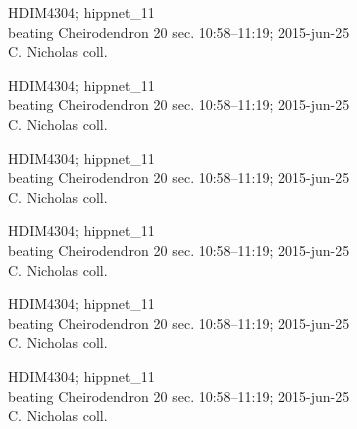 \documentclass[2pt]{extarticle}
\begin{document}
\noindent
\parbox{0.16\textwidth}{\tiny \raggedright \rule[-0.3\baselineskip]{0pt}{10pt}HDIM4304; hippnet\_11\\ beating Cheirodendron 20 sec. 10:58--11:19; 2015-jun-25\\ C. Nicholas coll.}
\parbox{0.16\textwidth}{\tiny \raggedright \rule[-0.3\baselineskip]{0pt}{10pt}HDIM4304; hippnet\_11\\ beating Cheirodendron 20 sec. 10:58--11:19; 2015-jun-25\\ C. Nicholas coll.}
\parbox{0.16\textwidth}{\tiny \raggedright \rule[-0.3\baselineskip]{0pt}{10pt}HDIM4304; hippnet\_11\\ beating Cheirodendron 20 sec. 10:58--11:19; 2015-jun-25\\ C. Nicholas coll.}
\parbox{0.16\textwidth}{\tiny \raggedright \rule[-0.3\baselineskip]{0pt}{10pt}HDIM4304; hippnet\_11\\ beating Cheirodendron 20 sec. 10:58--11:19; 2015-jun-25\\ C. Nicholas coll.}
\parbox{0.16\textwidth}{\tiny \raggedright \rule[-0.3\baselineskip]{0pt}{10pt}HDIM4304; hippnet\_11\\ beating Cheirodendron 20 sec. 10:58--11:19; 2015-jun-25\\ C. Nicholas coll.}
\parbox{0.16\textwidth}{\tiny \raggedright \rule[-0.3\baselineskip]{0pt}{10pt}HDIM4304; hippnet\_11\\ beating Cheirodendron 20 sec. 10:58--11:19; 2015-jun-25\\ C. Nicholas coll.} \\ 
\vspace{0.001in} 
\end{document}
